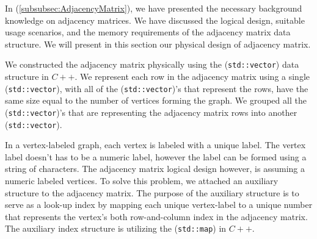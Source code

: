 {In (\ref{subsubsec:AdjacencyMatrix}), we have presented the necessary background knowledge on adjacency matrices. We have discussed the logical design, suitable usage scenarios, and the memory requirements of the adjacency matrix data structure. We will present in this section our physical design of adjacency matrix.


We constructed the adjacency matrix physically using the (\texttt{std::vector}) data structure in $C++$. We represent each row in the adjacency matrix using a single (\texttt{std::vector}), with all of the (\texttt{std::vector})'s that represent the rows, have the same size equal to the number of vertices forming the graph. We grouped all the (\texttt{std::vector})'s that are representing the adjacency matrix rows into another (\texttt{std::vector}).


In a vertex-labeled graph, each vertex is labeled with a unique label. The vertex label doesn't has to be a numeric label, however the label can be formed using a string of characters. The adjacency matrix logical design however, is assuming a numeric labeled vertices. To solve this problem, we attached an auxiliary structure to the adjacency matrix. The purpose of the auxiliary structure is to serve as a look-up index by mapping each unique vertex-label to a unique number that represents the vertex's both row-and-column index in the adjacency matrix. The auxiliary index structure is utilizing the (\texttt{std::map}) in $C++$.


}
